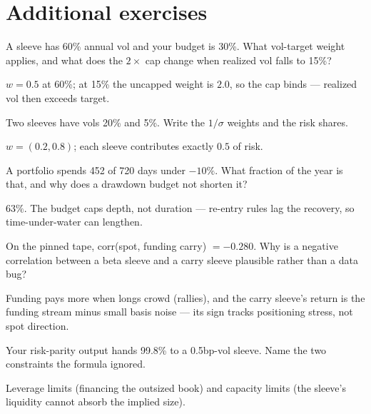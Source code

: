 \section*{Additional exercises}

\begin{exercise}[easy]
A sleeve has 60\% annual vol and your budget is 30\%. What
vol-target weight applies, and what does the $2\times$ cap change
when realized vol falls to 15\%?
\end{exercise}
\begin{solution}
$w=0.5$ at 60\%; at 15\% the uncapped weight is $2.0$, so the
cap binds --- realized vol then exceeds target.
\end{solution}

\begin{exercise}[easy]
Two sleeves have vols 20\% and 5\%. Write the $1/\sigma$ weights
and the risk shares.
\end{exercise}
\begin{solution}
$w=(0.2,0.8)$; each sleeve contributes exactly $0.5$ of risk.
\end{solution}

\begin{exercise}[easy]
A portfolio spends 452 of 720 days under $-10\%$. What fraction
of the year is that, and why does a drawdown budget not shorten it?
\end{exercise}
\begin{solution}
$63\%$. The budget caps depth, not duration --- re-entry rules
lag the recovery, so time-under-water can lengthen.
\end{solution}

\begin{exercise}[easy]
On the pinned tape, corr(spot, funding carry) $=-0.280$. Why is
a negative correlation between a beta sleeve and a carry sleeve
plausible rather than a data bug?
\end{exercise}
\begin{solution}
Funding pays more when longs crowd (rallies), and the carry
sleeve's return is the funding stream minus small basis noise ---
its sign tracks positioning stress, not spot direction.
\end{solution}

\begin{exercise}[easy]
Your risk-parity output hands 99.8\% to a 0.5bp-vol sleeve.
Name the two constraints the formula ignored.
\end{exercise}
\begin{solution}
Leverage limits (financing the outsized book) and capacity limits
(the sleeve's liquidity cannot absorb the implied size).
\end{solution}

